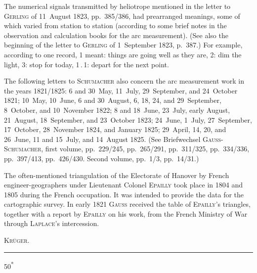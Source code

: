 \par\noindent\hspace*{\parindent}The numerical signals transmitted by heliotrope mentioned in the letter to \textsc{Gerling} of 11~August 1823, pp.~385/386, had prearranged meanings, some of which varied from station to station (according to some brief notes in the observation and calculation books for the arc measurement). (See also the beginning of the letter to \textsc{Gerling} of 1~September 1823, p.~387.) For example, according to one record, 1 meant: things are going well as they are, 2: dim the light, 3: stop for today, 1\,.\,1: depart for the next point.
\par\noindent\hspace*{\parindent}The following letters to \textsc{Schumacher} also concern the arc measurement work in the years 1821/1825: 6 and 30~May, 11~July, 29~September, and 24~October 1821; 10~May, 10~June, 6 and 30~August, 6, 18, 24, and 29~September, 8~October, and 10~November 1822; 8 and 18~June, 23~July, early August, 21~August, 18~September, and 23~October 1823; 24~June, 1~July, 27~September, 17~October, 28~November 1824, and January 1825; 29~April, 14, 20, and 26~June, 11 and 15~July, and 14~August 1825. (See Briefwechsel \textsc{Gauss-Schumacher}, first volume, pp.~229/245, pp.~265/291, pp.~311/325, pp.~334/336, pp.~397/413, pp.~426/430. Second volume, pp.~1/3, pp.~14/31.)
\par\noindent\hspace*{\parindent}The often-mentioned triangulation of the Electorate of Hanover by French engineer-geographers under Lieutenant Colonel \textsc{Epailly} took place in 1804 and 1805 during the French occupation. It was intended to provide the data for the cartographic survey. In early 1821 \textsc{Gauss} received the table of \textsc{Epailly}'s triangles, together with a report by \textsc{Epailly} on his work, from the French Ministry of War through \textsc{Laplace}'s intercession.
\par\noindent\hfill\textsc{Krüger}.\par
\endgroup
\begin{center}\rule{.12\linewidth}{.4pt}\end{center}
\vfill\noindent\hfill 50\textsuperscript{*}\hspace*{1.5em}\par

